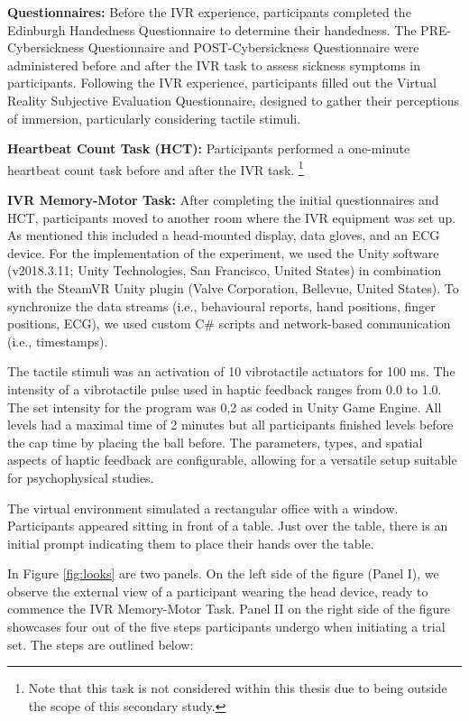 \documentclass[12pt,oneside,openright]{report}
\begin{document}
\textbf{Questionnaires:} Before the IVR experience, participants completed the Edinburgh Handedness Questionnaire to determine their handedness. The PRE-Cybersickness Questionnaire and POST-Cybersickness Questionnaire were administered before and after the IVR task to assess sickness symptoms in participants. Following the IVR experience, participants filled out the Virtual Reality Subjective Evaluation Questionnaire, designed to gather their perceptions of immersion, particularly considering tactile stimuli. 

\textbf{Heartbeat Count Task (HCT):} Participants performed a one-minute heartbeat count task before and after the IVR task. \footnote{Note that this task is not considered within this thesis due to being outside the scope of this secondary study.}

\textbf{IVR Memory-Motor Task:} 
After completing the initial questionnaires and HCT, participants moved to another room where the IVR equipment was set up. As mentioned this included a head-mounted display, data gloves, and an ECG device. 
For the implementation of the experiment, we used the Unity software (v2018.3.11; Unity Technologies, San Francisco, United States)  in combination with the SteamVR Unity plugin (Valve Corporation, Bellevue, United States). To synchronize the data streams (i.e., behavioural reports, hand positions, finger positions, ECG), we used custom C\# scripts and network-based communication (i.e., timestamps). 

The tactile stimuli was an activation of 10 vibrotactile actuators for 100 ms. The intensity of a vibrotactile pulse used in haptic feedback ranges from 0.0 to 1.0. The set intensity for the program was 0,2 as coded in Unity Game Engine. All levels had a maximal time of 2 minutes but all participants finished levels before the cap time by placing the ball before. The parameters, types, and spatial aspects of haptic feedback are configurable, allowing for a versatile setup suitable for psychophysical studies.

The virtual environment simulated a rectangular office with a window. Participants appeared sitting in front of a table. Just over the table, there is an initial prompt indicating them to place their hands over the table. 

In Figure \ref{fig:looks} are two panels. On the left side of the figure (Panel I), we observe the external view of a participant wearing the head device, ready to commence the IVR Memory-Motor Task. Panel II on the right side of the figure showcases four out of the five steps participants undergo when initiating a trial set. The steps are outlined below:
\end{document}
